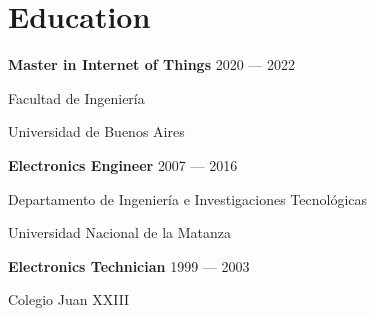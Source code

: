 \section{Education}

\parbox[t][][t]{\linewidth}{
	\parbox{\linewidth}{\textbf{Master in Internet of Things} \hfill {{2020 --- 2022}}}
	\parbox{\linewidth}{{Facultad de Ingeniería}}
	\parbox{\linewidth}{{Universidad de Buenos Aires}}
	\smallskip
	\smallskip
}

\parbox[t][][t]{\linewidth}{
	\parbox{\linewidth}{\textbf{Electronics Engineer} \hfill {{2007 --- 2016}}}
	\parbox{\linewidth}{{Departamento de Ingeniería e Investigaciones Tecnológicas}}
	\parbox{\linewidth}{{Universidad Nacional de la Matanza}}
	\smallskip
	\smallskip
}

\parbox[t][][t]{\linewidth}{
	\parbox{\linewidth}{\textbf{Electronics Technician} \hfill {{1999 --- 2003}}}
	\parbox{\linewidth}{{Colegio Juan XXIII}}
	\smallskip
	\smallskip
}

